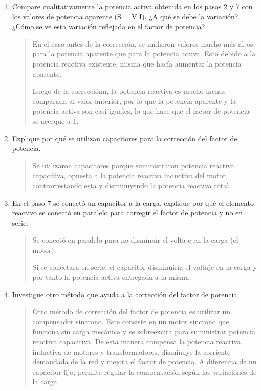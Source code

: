 \documentclass[12pt,a4paper]{article}
\begin{document}
\begin{enumerate}
    \item Compare cualitativamente la potencia activa obtenida en los pasos 2 y 7 con los valores de potencia aparente (S = V I). ¿A qué se debe la variación? ¿Cómo se ve esta variación reflejada en el factor de potencia?
    
    \begin{quote}
        En el caso antes de la corrección, se midieron valores mucho más altos para la potencia aparente que para la potencia activa. Esto debido a la potencia reactiva existente, misma que hacía aumentar la potencia aparente.

        Luego de la correcciónn, la potencia reactiva es mucho menos comparada al valor anterior, por lo que la potencia aparente y la potencia activa son casi iguales, lo que hace que el factor de potencia se acerque a 1.
    \end{quote}

    \item Explique por qué se utilizan capacitores para la corrección del factor de potencia.
    
    \begin{quote}
            Se utilizaron capacitores porque suministraron potencia reactiva capacitiva, opuesta a la potencia reactiva inductiva del motor, contrarrestando esta y disminuyendo la potencia reactiva total.
    \end{quote}

    \item En el paso 7 se conectó un capacitor a la carga, explique por qué el elemento reactivo se conectó en paralelo para corregir el factor de potencia y no en serie.
    
    \begin{quote}
        Se conectó en paralelo para no disminuir el voltaje en la carga (el motor).

        Si se conectara en serie, el capacitor disminuiría el voltaje en la carga y por tanto la potencia activa entregada a la misma.
    \end{quote}

    \item Investigue otro método que ayuda a la corrección del factor de potencia.

    \begin{quote}
        Otro método de corrección del factor de potencia es utilizar un compensador síncrono. Este consiste en un motor síncrono que funciona sin carga mecánica y se sobreexcita para suministrar potencia reactiva capacitiva. De esta manera compensa la potencia reactiva inductiva de motores y transformadores, disminuye la corriente demandada de la red y mejora el factor de potencia. A diferencia de un capacitor fijo, permite regular la compensación según las variaciones de la carga.
    \end{quote}


\end{enumerate}
\end{document}
